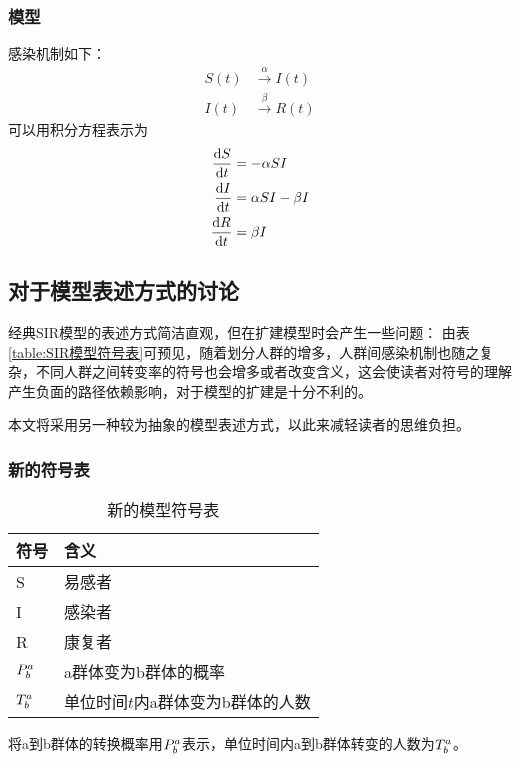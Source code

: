 \subsubsection{模型}
\par 感染机制如下：
\begin{align}
    S(t) & \xrightarrow \alpha I(t) \\
    I(t) & \xrightarrow \beta R(t)
\end{align}
可以用积分方程表示为
\begin{align}
    \dt{S} & = -\alpha SI          \\
    \dt{I} & = \alpha SI - \beta I \\
    \dt{R} & = \beta I
\end{align}
\subsection{对于模型表述方式的讨论}
\par 经典SIR模型的表述方式简洁直观，但在扩建模型时会产生一些问题：
由表\ref{table:SIR模型符号表}可预见，随着划分人群的增多，人群间感染机制也随之复杂，不同人群之间转变率的符号也会增多或者改变含义，这会使读者对符号的理解产生负面的路径依赖影响，对于模型的扩建是十分不利的。
\par 本文将采用另一种较为抽象的模型表述方式，以此来减轻读者的思维负担。
\subsubsection{新的符号表}
\begin{table}[H]
    \centering
    \caption{新的模型符号表}
    \begin{tabular}{ll}
        \hline
        符号       & 含义                              \\
        \hline
        S          & 易感者                            \\
        I          & 感染者                            \\
        R          & 康复者                            \\
        $\P{a}{b}$ & a群体变为b群体的概率              \\
        $\T{a}{b}$ & 单位时间$t$内a群体变为b群体的人数 \\
        \hline
    \end{tabular}
\end{table}
\par 将a到b群体的转换概率用$\P{a}{b}$表示，单位时间内a到b群体转变的人数为$\T{a}{b}$。

